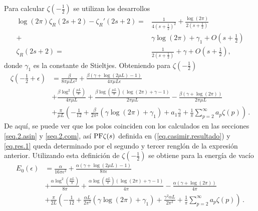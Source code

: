 Para calcular $\zeta \left( - \frac{1}{2} \right)$ se utilizan los desarrollos
\begin{align}\label{cortar}
	\log (2 \pi) \zeta _R (2s+2) -
	\zeta _R ' (2s+2) = & 
	\frac{1}{4 \left( s + \frac{1}{2} \right) ^2} + 
	\frac{ \log (2 \pi ) }{2 \left( s + \frac{1}{2} \right) } 
\\ \nonumber
	+ &  \gamma \log (2 \pi ) + \gamma _1 + O \left( s + \frac{1}{2} \right) \\
	\zeta _R (2s+2) = &\frac{1}{2 \left( s + \frac{1}{2} \right)} + \gamma + O \left( s + \frac{1}{2} \right)
	 ,
\end{align}
donde $\gamma _1$ es la constante de Stieltjes. Obteniendo para $\zeta \left( - \frac{1}{2} \right) $
\begin{align}\label{eq.zeta.final}
\zeta \left( - \frac{1}{2} + \epsilon \right) &=
		\frac{\beta}{8  \pi \mu L \epsilon ^2}	 +
	    \frac{
	    	\beta ( \gamma  +  \log (2 \mu L ) -1 ) }
	    	{4  \pi \mu L \epsilon } 
\\[5pt]
\nonumber
&
+
		\frac{\beta \log ^2 \left( \frac{\mu L}{\pi} \right)}{4 \pi \mu L}  +
		\frac{
			\beta \log \left( \frac{\mu L}{\pi}\right)
				( \log (2 \pi ) + \gamma -1)}
			{2 \pi \mu L}  
- \frac{\beta (\gamma + \log(2 \pi) )}{2 \pi \mu L}
\\[5pt]
\nonumber
&
+
\frac{\pi}{\mu L}  
					\left(
							- \frac{1}{12} +
							\frac{\beta}{2 \pi ^2} \left(
														\gamma \log (2 \pi)
														+ \gamma _1
														\right) +
								a _1 \frac{\gamma}{\pi} +
								\frac{1}{\pi} \sum _{p=2} ^{\infty}
								a_p \zeta (p) 
							\right) 
\, .
\end{align}
De aquí, se puede ver que los polos coinciden con los calculados en las secciones \ref{seq.2.asin} y \ref{seq.2.com}, así ${\rm PF} \zeta (s)$ definida en (\ref{eq.casimir.resultado}) y \eqref{eq.res.1} queda determinado por el segundo y tercer renglón de la expresión anterior. 
Utilizando esta definición de $\zeta \left( - \frac{1}{2} \right) $ se obtiene para la energía de vacío
\begin{align}\label{energia.vacio.final}
	E_ 0 (\epsilon )&=
		\frac{\alpha}{16  \pi  \epsilon ^2}	 
		+   \frac{
	    	\alpha ( \gamma  +  \log (2\mu L ) -1 ) }
	    	{8  \pi \epsilon } 
\\[5pt]
\nonumber
&+
	\frac{\alpha \log ^2 \left( \frac{\mu L}{\pi} \right)}{8 \pi}  +
		\frac{ 
			\alpha \log \left( \frac{\mu L}{\pi}\right)
				( \log (2 \pi ) + \gamma -1)}
			{4 \pi }  
	- \frac{\alpha (\gamma + \log (2 \pi ) )}{4 \pi}
\\[5pt]
\nonumber
&
+
	\frac{\pi}{2 L}  
			\left(
				- \frac{1}{12} +
				\frac{\alpha L}{2 \pi ^2} 
				\left(
					\gamma \log (2 \pi)
					+ \gamma _1
					\right) +
								\frac{\gamma ^2 \alpha L}{2 \pi ^2} +
								\frac{1}{\pi} \sum _{p=2} ^{\infty}
								a_p \zeta (p) 
							\right) 
\, .
\end{align}
